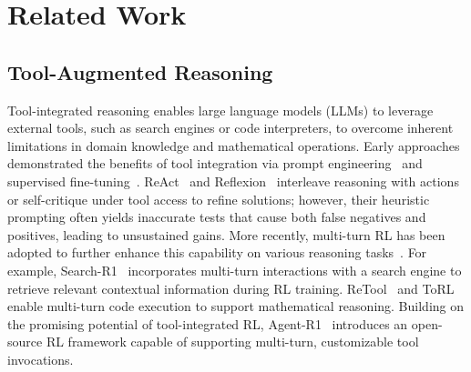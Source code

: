 \documentclass{article} %
\begin{document}
\section{Related Work}
\subsection{Tool-Augmented Reasoning}
Tool-integrated reasoning enables large language models (LLMs) to leverage external tools, such as search engines or code interpreters, to overcome inherent limitations in domain knowledge and mathematical operations. Early approaches demonstrated the benefits of tool integration via prompt engineering~\citep{yao2023reactsynergizingreasoningacting,chen2023programthoughtspromptingdisentangling,shinn2023reflexion} and supervised fine-tuning~\citep{gou2024toratoolintegratedreasoningagent}. ReAct~\citep{yao2023reactsynergizingreasoningacting} and Reflexion~\citep{shinn2023reflexion} interleave reasoning with actions or self-critique under tool access to refine solutions; however, their heuristic prompting often yields inaccurate tests that cause both false negatives and positives, leading to unsustained gains. More recently, multi-turn RL has been adopted to further enhance this capability on various reasoning tasks~\citep{jin2025searchr1trainingllmsreason, feng2025retoolreinforcementlearningstrategic,li2025torlscalingtoolintegratedrl}. For example, Search-R1~\citep{jin2025searchr1trainingllmsreason} incorporates multi-turn interactions with a search engine to retrieve relevant contextual information during RL training. ReTool~\citep{feng2025retoolreinforcementlearningstrategic} and ToRL~\citep{li2025torlscalingtoolintegratedrl} enable multi-turn code execution to support mathematical reasoning. Building on the promising potential of tool-integrated RL, Agent-R1~\citep{Agent-R1} introduces an open-source RL framework capable of supporting multi-turn, customizable tool invocations.
\end{document}
